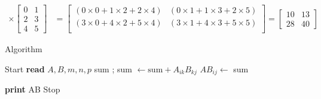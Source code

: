 \documentclass[11pt]{ipu-c}
\begin{document}
{\begin{align*}
            \times
            \begin{bmatrix}
                0 & 1 \\
                2 & 3 \\
                4 & 5
            \end{bmatrix}
            &=
            \begin{bmatrix}
                \left( 0\times{0} + 1\times{2} + 2\times{4} \right)
                & \left( 0\times{1} + 1\times{3} + 2\times{5} \right) \\
                \left( 3\times{0} + 4\times{2} + 5\times{4} \right)
                & \left( 3\times{1} + 4\times{3} + 5\times{5} \right) \\
            \end{bmatrix}
            =
            \begin{bmatrix}
                10 & 13 \\
                28 & 40
            \end{bmatrix}
        \end{align*}
    }

    \begin{tabularsection}{Algorithm}
        \begin{algorithmic}[1]
            \State Start
            \State \textbf{read} $A, B, m, n, p$
                    \State sum ;
                        \State sum $\gets \text{sum} + A_{ik} B_{kj}$
                    \EndFor
                    \State $AB_{ij} \gets$ sum
                \EndFor
            \EndFor

            \State \textbf{print} AB
            \State Stop
        \end{algorithmic}
    \end{tabularsection}
\end{document}
